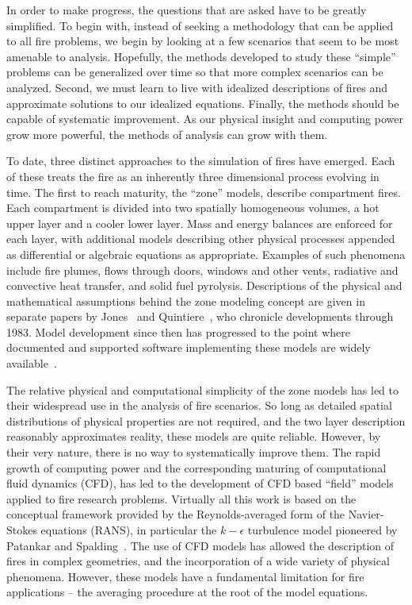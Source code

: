 \documentclass[11pt]{book}
\begin{document}
In order to make progress, the questions that are asked have to be greatly simplified.
To begin with, instead of seeking a methodology that can be applied to all fire problems,
we begin by looking at a few scenarios that seem to be most amenable to analysis.
Hopefully, the methods developed to study these ``simple'' problems can be generalized
over time so that more complex scenarios can be analyzed.
Second, we must learn to live with idealized descriptions of fires and approximate
solutions to our idealized equations. Finally, the methods should be capable of systematic improvement.
As our physical insight and computing power grow more powerful, the methods of analysis can
grow with them.

To date, three distinct approaches to the simulation of fires have emerged.
Each of these treats the fire as an inherently three dimensional process evolving in time.
The first to reach maturity, the ``zone'' models, describe compartment fires.
Each compartment is divided into two spatially homogeneous volumes, a hot upper layer and a cooler lower layer.
Mass and energy balances are enforced for each layer, with additional models describing other
physical processes appended as differential or algebraic equations as appropriate.
Examples of such phenomena include fire plumes, flows through doors, windows and other vents,
radiative and convective heat transfer, and solid fuel pyrolysis.
Descriptions of the physical and mathematical assumptions
behind the zone modeling concept are given in separate papers by Jones~\cite{Jones:1} and Quintiere~\cite{Quintiere:1},
who chronicle developments through 1983.
Model development since then has progressed to the point where
documented and supported software implementing these models are widely available~\cite{Forney:1}.

The relative physical and computational simplicity of the zone models has led to their
widespread use in the analysis of fire scenarios. So long as detailed spatial
distributions of physical properties are not required, and the two layer description
reasonably approximates reality, these models are quite reliable.
However, by their very nature, there is no way to systematically improve them.
The rapid growth of computing power and the corresponding maturing of computational
fluid dynamics (CFD), has led to the development of CFD based ``field'' models applied to fire research problems.
Virtually all this work is based on the conceptual framework provided by the Reynolds-averaged form of the
Navier-Stokes equations (RANS), in particular the $k -\epsilon$ turbulence model pioneered by
Patankar and Spalding~\cite{Patankar:1}. The use of CFD models has allowed
the description of fires in complex geometries, and the incorporation of a wide variety of
physical phenomena. However, these models have a fundamental limitation for fire applications --
the averaging procedure at the root of the model equations.
\end{document}
